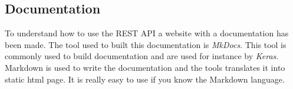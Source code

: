 %
%
%
%
%
%
%
%
%
%
%
%
%
%

\subsection{Documentation}
To understand how to use the REST API a website with a documentation has been made. The tool used to built this documentation is \textit{MkDocs}. This tool is commonly used to build documentation and are used for instance by \textit{Keras}. Markdown is used to write the documentation and the tools translates it into static html page. It is really easy to use if you know the Markdown language. \\

